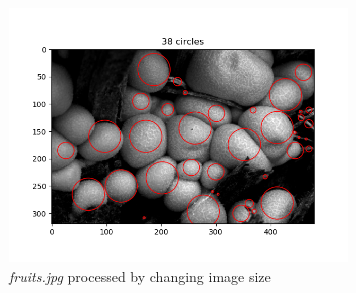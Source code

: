 \documentclass{article}
\begin{document}
\begin{figure}[H]
\centering
\includegraphics[width=0.8\textwidth]{figs/fruits_image.png}
\caption{\textit{fruits.jpg} processed by changing image size}
\end{figure}
\end{document}
